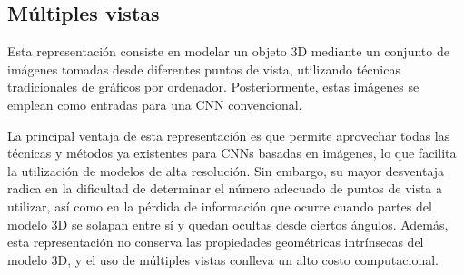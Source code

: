 \subsection{Múltiples vistas}
Esta representación consiste en modelar un objeto 3D mediante un conjunto de imágenes tomadas desde diferentes puntos de vista, utilizando técnicas tradicionales de gráficos por ordenador. Posteriormente, estas imágenes se emplean como entradas para una CNN convencional.

La principal ventaja de esta representación es que permite aprovechar todas las técnicas y métodos ya existentes para CNNs basadas en imágenes, lo que facilita la utilización de modelos de alta resolución. Sin embargo, su mayor desventaja radica en la dificultad de determinar el número adecuado de puntos de vista a utilizar, así como en la pérdida de información que ocurre cuando partes del modelo 3D se solapan entre sí y quedan ocultas desde ciertos ángulos. Además, esta representación no conserva las propiedades geométricas intrínsecas del modelo 3D, y el uso de múltiples vistas conlleva un alto costo computacional.